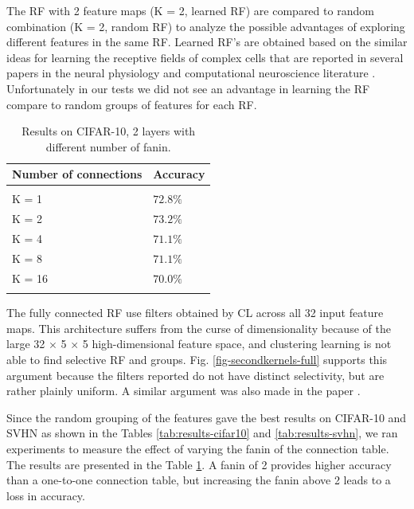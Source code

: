 \documentclass{article} %
\begin{document}
The RF with 2 feature maps (K = 2, learned RF) are compared to random combination (K = 2, random RF) to analyze the possible advantages of exploring different features in the same RF. Learned RF's are obtained  based on the similar ideas for learning the receptive fields of complex cells that are reported in  several papers in the neural physiology and computational neuroscience literature \cite{masquelier2007learning,spratling2005learning,wiskott2002slow,wallis1997invariant}.
Unfortunately in our tests we did not see an advantage in learning the RF compare to random groups of features for each RF.

\setlength{\tabcolsep}{10pt}

\begin{table}
\caption{Results on CIFAR-10, 2 layers with different number of fanin.}
\begin{centering}
\begin{tabular}{ll}
\multicolumn{1}{c}{\bf Number of connections}  &\multicolumn{1}{c}{\bf Accuracy}\\
\hline \hline \\
K = 1		&$72.8\%$\\
K = 2		&$73.2\%$\\
K = 4		&$71.1\%$\\
K = 8		&$71.1\%$\\
K = 16		&$70.0\%$
\\ \hline \hline 
\label{tab:fanin}
\end{tabular}
\end{centering}
\end{table}

The fully connected RF use filters obtained by CL across all 32 input feature maps. This architecture suffers from the curse of dimensionality because of the large 32 $\times$ 5 $\times$ 5 high-dimensional feature space, and clustering learning is not able to find selective RF and groups.
Fig. \ref{fig-secondkernels-full} supports this argument because the filters reported do not have distinct selectivity, but are rather plainly uniform. A similar argument was also made in the paper \cite{coates2012learning}.

Since the random grouping of the features gave the best results on CIFAR-10 and SVHN as shown in the Tables \ref{tab:results-cifar10} and \ref{tab:results-svhn}, we ran experiments to measure the effect of varying the fanin of the connection table.
The results are presented in the Table \ref{tab:fanin}. A fanin of 2 provides higher accuracy than a one-to-one connection table, but increasing the fanin above 2 leads to a loss in accuracy.
\end{document}
